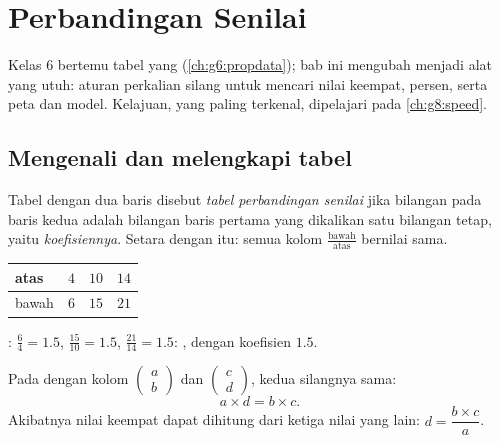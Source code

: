 \chapter{Perbandingan Senilai}\label{ch:g7:prop}

Kelas 6 bertemu tabel yang  (\cref{ch:g6:propdata}); bab ini
mengubah  menjadi alat yang utuh: aturan perkalian
silang untuk mencari nilai keempat, persen, serta  peta dan
model. Kelajuan,  yang paling terkenal, dipelajari
pada \cref{ch:g8:speed}.

\section{Mengenali dan melengkapi tabel}

\begin{definition}\label{def:g7:prop:table}
Tabel dengan dua baris disebut \emph{tabel perbandingan
senilai} jika bilangan pada baris kedua
adalah bilangan baris pertama yang dikalikan satu bilangan tetap, yaitu
\emph{koefisiennya}. Setara dengan itu: semua  kolom
$\frac{\text{bawah}}{\text{atas}}$ bernilai sama.
\end{definition}

\begin{example}\label{ex:g7:prop:recognize}
\begin{center}
\renewcommand{\arraystretch}{1.3}
\begin{tabular}{l|ccc}
atas & $4$ & $10$ & $14$ \\
\hline
bawah & $6$ & $15$ & $21$ \\
\end{tabular}
\end{center}
: $\frac64 = 1.5$, $\frac{15}{10} = 1.5$,
$\frac{21}{14} = 1.5$: , dengan koefisien $1.5$.
\end{example}

\begin{theorem}\label{thm:g7:prop:cross}
Pada  dengan kolom $\begin{pmatrix} a \\ b
\end{pmatrix}$ dan $\begin{pmatrix} c \\ d \end{pmatrix}$, kedua  silangnya sama:
\[
a \times d = b \times c .
\]
Akibatnya nilai keempat dapat dihitung dari ketiga nilai yang lain:
$d = \dfrac{b \times c}{a}$.
\end{theorem}

